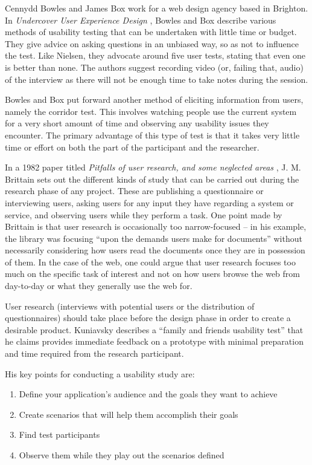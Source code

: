 Cennydd Bowles and James Box work for a web design agency based in Brighton.
In \emph{Undercover User Experience Design} \cite{bowles2011undercover},
Bowles and Box describe various methods of usability testing that can be
undertaken with little time or budget. They give advice on asking questions in
an unbiased way, so as not to influence the test. Like Nielsen, they advocate
around five user tests, stating that even one is better than none. The authors
suggest recording video (or, failing that, audio) of the interview as there
will not be enough time to take notes during the session.

Bowles and Box put forward another method of eliciting information from users,
namely the corridor test. This involves watching people use the current system
for a very short amount of time and observing any usability issues they
encounter. The primary advantage of this type of test is that it takes very
little time or effort on both the part of the participant and the researcher.

In a 1982 paper titled \emph{Pitfalls of user research, and some neglected
areas} \cite{brittain1982pitfalls}, J. M. Brittain sets out the different
kinds of study that can be carried out during the research phase of any
project. These are publishing a questionnaire or interviewing users, asking
users for any input they have regarding a system or service, and observing
users while they perform a task. One point made by Brittain is that user
research is occasionally too narrow-focused -- in his example, the library was
focusing ``upon the demands users make for documents'' without necessarily
considering how users read the documents once they are in possession of them.
In the case of the web, one could argue that user research focuses too much on
the specific task of interest and not on how users browse the web from
day-to-day or what they generally use the web for.

User research (interviews with potential users or the distribution of
questionnaires) should take place before the design phase in order to create a
desirable product. Kuniavsky \cite{kuniavsky2003userexperience} describes a
``family and friends usability test'' that he claims provides immediate
feedback on a prototype with minimal preparation and time required from the
research participant.

His key points for conducting a usability study are:

\begin{enumerate}
  \item Define your application's audience and the goals they want to achieve
  \item Create scenarios that will help them accomplish their goals
  \item Find test participants
  \item Observe them while they play out the scenarios defined
\end{enumerate}

